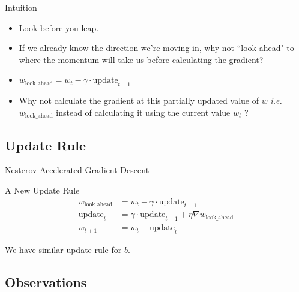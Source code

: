 \documentclass[10pt, aspectratio=169]{beamer}
\begin{document}
\begin{frame}
\begin{block}{Intuition}
\begin{itemize}
\item<1-> Look before you leap.
\item<2-> If we already know the direction we’re moving in, why not ``look ahead" to where the momentum will take us before calculating the gradient?
\item<3-> $w_{\text{look\_ahead}} = w_t - \gamma \cdot \text{update}_{t-1}$
\item<4-> Why not calculate the gradient at this partially updated value
 of $w$ \textit{i.e.} $w_{\text{look\_ahead}}$ instead of calculating it using the current value $w_t$ ?
\end{itemize}
\end{block}
\end{frame}


\subsection{Update Rule}

\begin{frame}{Nesterov Accelerated Gradient Descent}
\begin{block}{A New Update Rule}
\begin{align*}
w_{\text{look\_ahead}} &= w_t - \gamma \cdot \text{update}_{t-1} \\
\text{update}_t &= \gamma \cdot \text{update}_{t-1} + \eta \nabla w_{\text{look\_ahead}} \\
w_{t+1} &= w_t - \text{update}_t
\end{align*}

We have similar update rule for $b$.
\end{block}
\end{frame}


\subsection{Observations}
\end{document}
